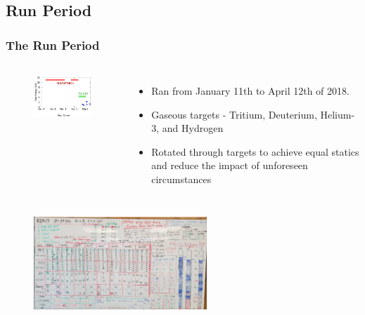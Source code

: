 \documentclass[12pt]{beamer}
\begin{document}
\subsection[Run Period]{Run Period}
\begin{frame}
\frametitle{The Run Period}
\vspace{-20pt}
\begin{columns}
	\begin{figure}
		\includegraphics[width=4.5cm]{../images/run_per}
	\end{figure}
	\vspace{-10pt}
	\begin{itemize}
		\item Ran from January 11th to April 12th of 2018.
		\item Gaseous targets - Tritium, Deuterium, Helium-3, and Hydrogen
		\item Rotated through targets to achieve equal statics and reduce the impact of unforeseen circumstances
	\end{itemize}
\end{columns}
\begin{figure}
	\includegraphics[width=6.5cm]{../images/whiteboard_2_20}
\end{figure}
\end{frame}
\end{document}
